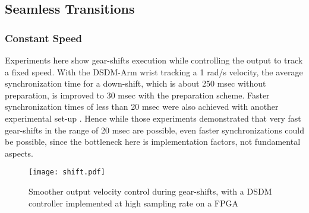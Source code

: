 \subsection{Seamless Transitions}

\subsubsection{Constant Speed}
Experiments here show gear-shifts execution while controlling the output to track a fixed speed. With the DSDM-Arm wrist tracking a 1 rad/s velocity, the average synchronization time for a down-shift, which is about 250 msec without preparation, is improved to 30 msec with the preparation scheme. Faster synchronization times of less than 20 msec were also achieved with another experimental set-up \cite{girard_two-speed_2015}. Hence while those experiments demonstrated that very fast gear-shifts in the range of 20 msec are possible, even faster synchronizations could be possible, since the bottleneck here is implementation factors, not fundamental aspects. 

\begin{figure}[t]
	\centering
		\texttt{[image: shift.pdf]}
	\caption[Smoother output velocity control during gear-shifts]{Smoother output velocity control during gear-shifts, with a DSDM controller implemented at high sampling rate on a FPGA}
	\label{fig:shifts}
\end{figure}

